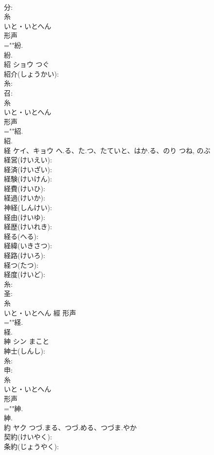 \documentclass[8pt]{extreport}
\begin{document}
\begin{CJK}{UTF8}{min}
\\	分: 
\\	糸	
\\	いと・いとへん	
\\	形声 
\\	=""紛.
\\	紛.
\\	紹	ショウ		つぐ	
\\	紹介(しょうかい): 
\\	糸: 
\\	召: 
\\	糸	
\\	いと・いとへん	
\\	形声 
\\	=""紹.
\\	紹.
\\	経	ケイ、キョウ	へ.る、た.つ、たていと、はか.る、のり	つね, のぶ	
\\	経営(けいえい): 
\\	経済(けいざい): 
\\	経験(けいけん): 
\\	経費(けいひ): 
\\	経過(けいか): 
\\	神経(しんけい): 
\\	経由(けいゆ): 
\\	経歴(けいれき): 
\\	経る(へる): 
\\	経緯(いきさつ): 
\\	経路(けいろ): 
\\	経つ(たつ): 
\\	経度(けいど): 
\\	糸: 
\\	圣: 
\\	糸	
\\	いと・いとへん	經	形声 
\\	=""経.
\\	経.
\\	紳	シン		まこと	
\\	紳士(しんし): 
\\	糸: 
\\	申: 
\\	糸	
\\	いと・いとへん	
\\	形声 
\\	=""紳.
\\	紳.
\\	約	ヤク	つづ.まる、つづ.める、つづま.やか		
\\	契約(けいやく): 
\\	条約(じょうやく): 

\end{CJK}
\end{document}
